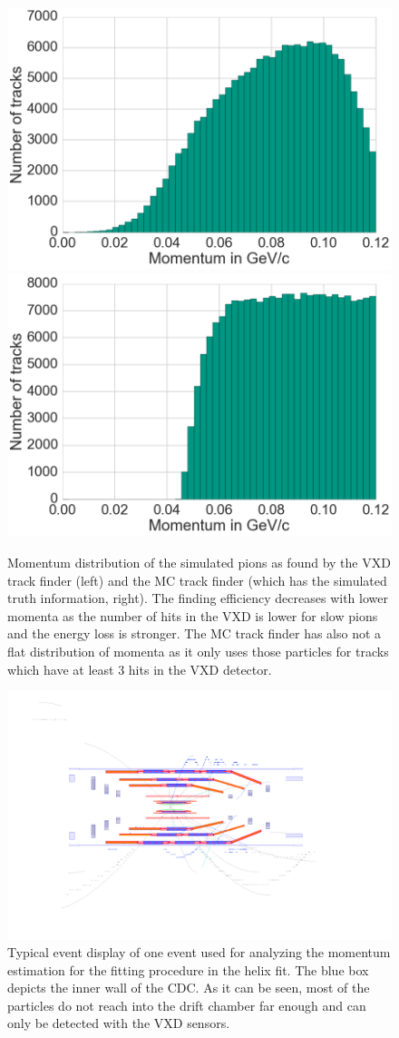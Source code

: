 \begin{figure}
 \centering
 \includegraphics[width=0.48\linewidth]{figures/vxd/finding_efficiency.png}
 \includegraphics[width=0.48\linewidth]{figures/vxd/finding_efficiency_mc.png}
 \caption[Momentum distribution of the found and simulated pions.]{Momentum distribution of the simulated pions as found by the VXD track finder (left) and the MC track finder (which has the simulated truth information, right). The finding efficiency decreases with lower momenta as the number of hits in the VXD is lower for slow pions and the energy loss is stronger. The MC track finder has also not a flat distribution of momenta as it only uses those particles for tracks which have at least 3 hits in the VXD detector.}
 \label{fig-vxd-finding-efficiency}
\end{figure}

\begin{figure}
 \centering
 \includegraphics[width=0.8\linewidth]{figures/vxd/event_display.png}
 \caption[Typical event display of slow pions.]{Typical event display of one event used for analyzing the momentum estimation for the fitting procedure in the helix fit. The blue box depicts the inner wall of the CDC. As it can be seen, most of the particles do not reach into the drift chamber far enough and can only be detected with the VXD sensors.}
 \label{fig-vxd-event-display}
\end{figure}

